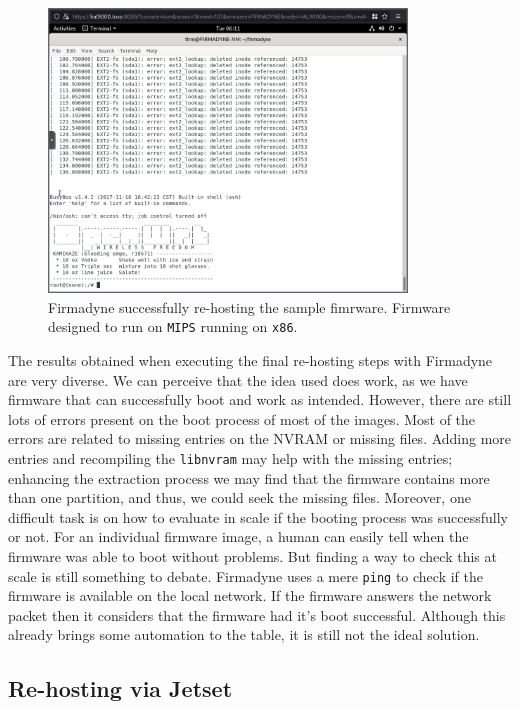 \begin{figure}[H]
    \centering
    \includegraphics[width=0.85\textwidth]{figs/firmadyne-success.png}
    \caption{Firmadyne successfully re-hosting the sample fimrware. Firmware designed to run on {\tt MIPS} running on {\tt x86}.}
    \label{fig:firmadyne-success}
\end{figure}

The results obtained when executing the final re-hosting steps with Firmadyne are very diverse. We can perceive that the idea used does work, as we have firmware that can successfully boot and work as intended. However, there are still lots of errors present on the boot process of most of the images. Most of the errors are related to missing entries on the NVRAM or missing files. Adding more entries and recompiling the {\tt libnvram} may help with the missing entries; enhancing the extraction process we may find that the firmware contains more than one partition, and thus, we could seek the missing files. Moreover, one difficult task is on how to evaluate in scale if the booting process was successfully or not. For an individual firmware image, a human can easily tell when the firmware was able to boot without problems. But finding a way to check this at scale is still something to debate. Firmadyne uses a mere {\tt ping} to check if the firmware is available on the local network. If the firmware answers the network packet then it considers that the firmware had it's boot successful. Although this already brings some automation to the table, it is still not the ideal solution.


\subsection{Re-hosting via Jetset}
\label{sec:result-jetset}

